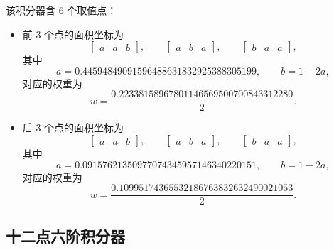 该积分器含 6 个取值点：
\begin{itemize}[wide]
\item 前 3 个点的面积坐标为
\begin{equation}
\begin{bmatrix}a & a & b\end{bmatrix},\qquad\begin{bmatrix}a & b & a\end{bmatrix},\qquad\begin{bmatrix}b & a & a\end{bmatrix},
\end{equation}
其中
\begin{equation}
a=0.44594849091596488631832925388305199,\qquad b=1-2a,
\end{equation}
对应的权重为
\begin{equation}
w=\frac{0.22338158967801146569500700843312280}{2}.
\end{equation}
\item 后 3 个点的面积坐标为
\begin{equation}
\begin{bmatrix}a & a & b\end{bmatrix},\qquad\begin{bmatrix}a & b & a\end{bmatrix},\qquad\begin{bmatrix}b & a & a\end{bmatrix},
\end{equation}
其中
\begin{equation}
a=0.09157621350977074345957146340220151,\qquad b=1-2a,
\end{equation}
对应的权重为
\begin{equation}
w=\frac{0.10995174365532186763832632490021053}{2}.
\end{equation}
\end{itemize}
%

\subsection{十二点六阶积分器}

